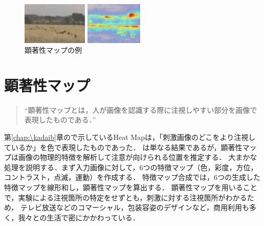 \begin{figure}
    \centering
    \begin{minipage}{.19\textwidth}
        \centering
        \includegraphics[height=2cm,width=\textwidth]{../../Figures/kenty2.png}
    \end{minipage}
    \begin{minipage}{.19\textwidth}
        \centering
        \includegraphics[height=2cm,width=\textwidth]{../../Figures/kenty1.png}
    \end{minipage}
    \caption{顕著性マップの例\cite{動画像コンテンツにおける注視点マップと顕著性マップとの関係性に関する考察}}
    \vspace{-1.3cm}
\end{figure}
\section{顕著性マップ}
\begin{quote}
    ``顕著性マップとは，人が画像を認識する際に注視しやすい部分を画像で表現したものである．''\hfill\cite{顕著性マップを用いた画質評価法}
\end{quote}
第\ref{chap:\kadaib}章ので示しているHeat Mapは，「刺激画像のどこをより注視しているか」を色で表現したものであった．
は単なる結果であるが，顕著性マップは画像の物理的特徴を解析して注意が向けられる位置を推定する．
大まかな処理を説明する．まず入力画像に対して，6つの特徴マップ（色，彩度，方位，コントラスト，点滅，運動）を作成する．
特徴マップ合成では，6つの生成した特徴マップを線形和し，顕著性マップを算出する．
顕著性マップを用いることで，実験による注視箇所の特定をせずとも，刺激に対する注視箇所がわかるため，
テレビ放送などのコマーシャル，包装容姿のデザインなど，商用利用も多く，我々との生活で密にかかわっている．\\
\hfill\cite{動画像コンテンツにおける注視点マップと顕著性マップとの関係性に関する考察}
